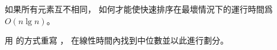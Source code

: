 \startEXERCISE
如果所有元素互不相同，
如何才能使快速排序在最壞情況下的運行時間爲 $O(n\lg{n})$。
\stopEXERCISE

\startANSWER
用  的方式重寫 ，
在線性時間內找到中位數並以此進行劃分。
\stopANSWER
